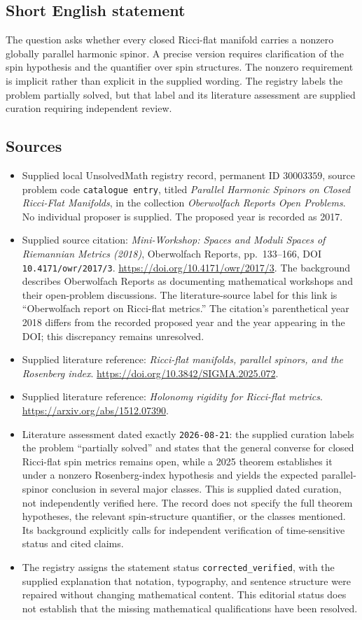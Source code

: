 \documentclass[11pt]{article}
\begin{document}
\subsection{Short English statement}
The question asks whether every closed Ricci-flat manifold carries a nonzero globally parallel harmonic spinor. A precise version requires clarification of the spin hypothesis and the quantifier over spin structures. The nonzero requirement is implicit rather than explicit in the supplied wording. The registry labels the problem partially solved, but that label and its literature assessment are supplied curation requiring independent review.
\subsection{Sources}
\begin{itemize}
\item Supplied local UnsolvedMath registry record, permanent ID \(30003359\), source problem code \texttt{catalogue entry}, titled \emph{Parallel Harmonic Spinors on Closed Ricci-Flat Manifolds}, in the collection \emph{Oberwolfach Reports Open Problems}. No individual proposer is supplied. The proposed year is recorded as 2017.
\item Supplied source citation: \emph{Mini-Workshop: Spaces and Moduli Spaces of Riemannian Metrics (2018)}, Oberwolfach Reports, pp.\ 133--166, DOI \texttt{10.4171/owr/2017/3}. \url{https://doi.org/10.4171/owr/2017/3}. The background describes Oberwolfach Reports as documenting mathematical workshops and their open-problem discussions. The literature-source label for this link is ``Oberwolfach report on Ricci-flat metrics.'' The citation's parenthetical year 2018 differs from the recorded proposed year and the year appearing in the DOI; this discrepancy remains unresolved.
\item Supplied literature reference: \emph{Ricci-flat manifolds, parallel spinors, and the Rosenberg index}. \url{https://doi.org/10.3842/SIGMA.2025.072}.
\item Supplied literature reference: \emph{Holonomy rigidity for Ricci-flat metrics}. \url{https://arxiv.org/abs/1512.07390}.
\item Literature assessment dated exactly \texttt{2026-08-21}: the supplied curation labels the problem ``partially solved'' and states that the general converse for closed Ricci-flat spin metrics remains open, while a 2025 theorem establishes it under a nonzero Rosenberg-index hypothesis and yields the expected parallel-spinor conclusion in several major classes. This is supplied dated curation, not independently verified here. The record does not specify the full theorem hypotheses, the relevant spin-structure quantifier, or the classes mentioned. Its background explicitly calls for independent verification of time-sensitive status and cited claims.
\item The registry assigns the statement status \texttt{corrected\_verified}, with the supplied explanation that notation, typography, and sentence structure were repaired without changing mathematical content. This editorial status does not establish that the missing mathematical qualifications have been resolved.
\end{itemize}
\end{document}
